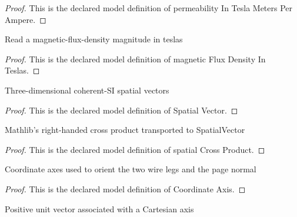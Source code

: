 \begin{proof}
  This is the declared model definition of permeability In Tesla Meters Per Ampere.
\end{proof}
\begin{definition}
  \label{def:physics:phyx-mini-0961:phyxminiproblems-problemphyxmini0961-magneticfluxdensityinteslas}
  Read a magnetic-flux-density magnitude in teslas
\end{definition}
\begin{proof}
  This is the declared model definition of magnetic Flux Density In Teslas.
\end{proof}
\begin{definition}
  \label{def:physics:phyx-mini-0961:phyxminiproblems-problemphyxmini0961-spatialvector}
  Three-dimensional coherent-SI spatial vectors
\end{definition}
\begin{proof}
  This is the declared model definition of Spatial Vector.
\end{proof}
\begin{definition}
  \label{def:physics:phyx-mini-0961:phyxminiproblems-problemphyxmini0961-spatialcrossproduct}
  Mathlib's right-handed cross product transported to SpatialVector
\end{definition}
\begin{proof}
  This is the declared model definition of spatial Cross Product.
\end{proof}
\begin{definition}
  \label{def:physics:phyx-mini-0961:phyxminiproblems-problemphyxmini0961-coordinateaxis}
  Coordinate axes used to orient the two wire legs and the page normal
\end{definition}
\begin{proof}
  This is the declared model definition of Coordinate Axis.
\end{proof}
\begin{definition}
  \label{def:physics:phyx-mini-0961:phyxminiproblems-problemphyxmini0961-axisvector}
  Positive unit vector associated with a Cartesian axis
\end{definition}
